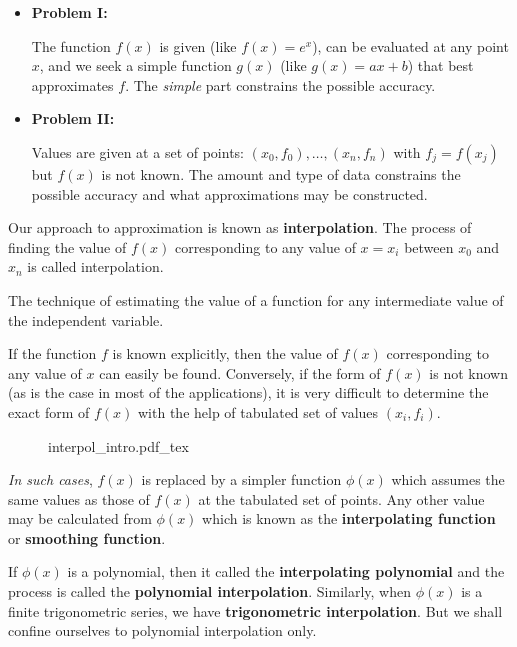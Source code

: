\begin{itemize}
	\item \hypertarget{mar4:int_prob:1}{\textbf{Problem I:}} The function $f(x)$ is given (like $f(x) = e^x$), can be evaluated at any point	$x$, and we seek a simple function $g(x)$ (like $g(x) = ax + b$) that best approximates $f$. The \textit{simple} part constrains the possible accuracy.
	\item \hypertarget{mar4:int_prob:2}{\textbf{Problem II:}} Values are given at a set of points: $(x_0, f_0), \ldots ,(x_n, f_n) $ with $f_j = f(x_j)$ but $f(x)$ is not known. The amount and type of data constrains the possible accuracy and what approximations may be constructed.
\end{itemize}

Our approach to approximation is known as \textbf{interpolation}. The process of finding the value of $f(x)$ corresponding to any value of $x = x_i$ between $x_0$ and $x_n$ is called interpolation.
\begin{defn}
	The technique of estimating the value of a function for any intermediate value of the independent variable.
\end{defn}
If the function $f$ is known explicitly, then the value of $f(x)$ corresponding to any value of $x$ can easily be found. Conversely, if the form of $f(x)$ is not known (as is the case in most of the applications), it is very difficult to determine the exact form of $f(x)$ with the help of tabulated set of values $(x_i, f_i)$.

\begin{figure}[H]
	\centering
	\def\svgwidth{0.8\textwidth}
	{interpol_intro.pdf_tex}
	\caption{}
	\label{fig1:mar4}
\end{figure}

\textit{In such cases}, $f(x)$ is replaced by a simpler function $\phi(x)$ which assumes the same values as those of $f(x)$ at the tabulated set of points. Any other value may be calculated from $\phi(x)$ which is known as the \textbf{interpolating function} or \textbf{smoothing function}.

\begin{rmk}
	If $\phi(x)$ is a polynomial, then it called the \textbf{interpolating polynomial} and the process is called the \textbf{polynomial interpolation}. Similarly, when $\phi(x)$ is a finite trigonometric series, we have \textbf{trigonometric interpolation}. But we shall confine ourselves to polynomial interpolation only.
\end{rmk}


